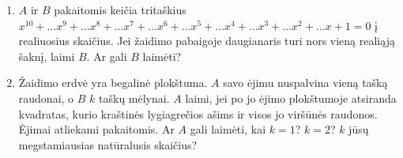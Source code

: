\begin{enumerate}
%

\item $A$ ir $B$ pakaitomis keičia tritaškius $x^{10}+\dots x^9+\dots x^8+\dots
  x^7+\dots x^6+\dots x^5+\dots x^4+\dots x^3+\dots x^2+\dots x+1=0$ į
  realiuosius skaičius. Jei žaidimo pabaigoje daugianaris turi nors vieną
  realiąją šaknį, laimi $B$. Ar gali $B$ laimėti?


\item \text{[Kvant 1987]} Žaidimo erdvė yra begalinė plokštuma. $A$ savo
  ėjimu nuspalvina vieną tašką raudonai, o $B$ $k$ taškų mėlynai. $A$
  laimi, jei po jo ėjimo plokštumoje atsiranda kvadratas, kurio kraštinės
  lygiagrečios ašims ir visos jo viršūnės raudonos. Ėjimai atliekami
  pakaitomis. Ar $A$ gali laimėti, kai $k=1$? $k=2$? $k$ jūsų
  megstamiausias natūralusis skaičius? 


\end{enumerate}
